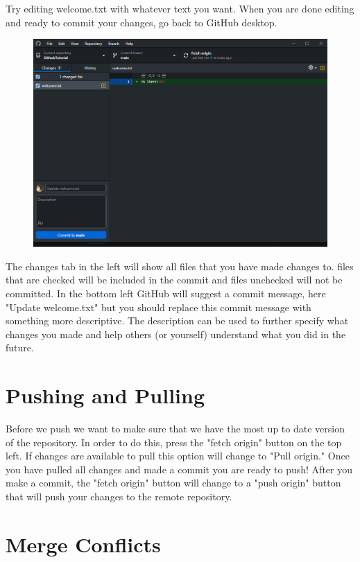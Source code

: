 \documentclass{article}
\begin{document}
    Try editing welcome.txt with whatever text you want. When you are done editing and ready to commit your changes, go back to GitHub desktop.
    \begin{figure}
        \centering
        \includegraphics[width=1\linewidth]{commit.png}
    \end{figure}
    The changes tab in the left will show all files that you have made changes to. files that are checked will be included in the commit and files unchecked will not be committed. In the bottom left GitHub will suggest a commit message, here "Update welcome.txt" but you should replace this commit message with something more descriptive. The description can be used to further specify what changes you made and help others (or yourself) understand what you did in the future.

\section{Pushing and Pulling}

    Before we push we want to make sure that we have the most up to date version of the repository. In order to do this, press the "fetch origin" button on the top left. If changes are available to pull this option will change to "Pull origin." Once you have pulled all changes and made a commit you are ready to push! After you make a commit, the "fetch origin" button will change to a "push origin" button that will push your changes to the remote repository.

\section{Merge Conflicts}
\end{document}
